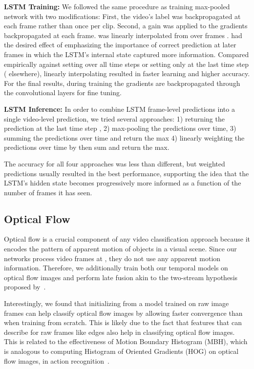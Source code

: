 \documentclass[10pt,twocolumn,letterpaper]{article}
\begin{document}
\textbf{LSTM Training:} We followed the same procedure as training max-pooled
network with two modifications: First,  the
video's label was backpropagated at each frame rather than once per clip.
Second, a gain  was applied to the gradients backpropagated at each frame.
 was linearly interpolated from  over frames .  had the
desired effect of emphasizing the importance of correct prediction at later
frames in which the LSTM's internal state captured more information. Compared
empirically against setting  over all time steps or setting  only at
the last time step  ( elsewhere), linearly interpolating  resulted
in faster learning and higher accuracy. For the final results, during training
the gradients are backpropagated through the convolutional layers for fine
tuning.

\textbf{LSTM Inference:} In order to combine LSTM frame-level predictions into a single video-level
prediction, we tried several approaches: 1) returning the prediction at
the last time step , 2) max-pooling the predictions over time,
3) summing the predictions over time and return the max 4)
linearly weighting the predictions over time by  then sum and return
the max.

The accuracy for all four approaches was less than  different,
but weighted predictions usually resulted in the best performance,
supporting the idea that the LSTM's hidden state becomes progressively
more informed as a function of the number of frames it has seen.


\vspace{-.6em}
\subsection{Optical Flow}
\vspace{-.6em}
Optical flow is a crucial component of any video classification approach because it encodes the pattern of
apparent motion of objects in a visual scene.
Since our networks process video frames at , they do not use any apparent motion information.
Therefore, we additionally train both our temporal models on optical flow
 images and perform late fusion akin to the two-stream hypothesis proposed by~\cite{simonyan2014two}.

 Interestingly, we found that initializing from a model trained on raw image
 frames can help classify optical flow images by allowing faster convergence
 than when training from scratch. This is likely due to the fact that features that can describe for raw
 frames like edges also help in classifying optical flow images. This is
 related to the effectiveness of Motion Boundary Histogram (MBH), which is analogous to computing Histogram of Oriented Gradients (HOG) on
 optical flow images, in action recognition~\cite{wang13}.
\end{document}
